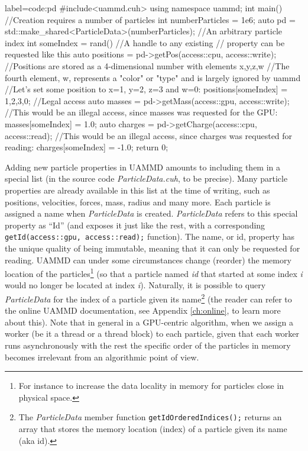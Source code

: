 \documentclass[ twoside,openright,titlepage,numbers=noenddot,%
headinclude,footinclude,cleardoublepage=empty,abstract=on,
BCOR=5mm,paper=b5,fontsize=11pt, dvipsnames
]{scrreprt}
\def\ucpp{uammd_cpp_lexer.py:UAMMDCppLexer -x}
\newcommand{\uammd}{\gls{UAMMD}\xspace}
\begin{document}
\begin{code2}
  {label=code:pd}
#include<uammd.cuh>
using namespace uammd; 
int main(){
  //Creation requires a number of particles
  int numberParticles = 1e6;
  auto pd = std::make_shared<ParticleData>(numberParticles);
  //An arbitrary particle index
  int someIndex = rand()%
  //A handle to any existing 
  // property can be requested like this
  auto positions = pd->getPos(access::cpu, access::write);
  //Positions are stored as a 4-dimensional number with elements x,y,z,w
  //The fourth element, w, represents a "color" or "type" and is largely ignored by uammd
  //Let's set some position to x=1, y=2, z=3 and w=0:
  positions[someIndex] = {1,2,3,0}; //Legal access
  auto masses = pd->getMass(access::gpu, access::write);
  //This would be an illegal access, since masses was requested for the GPU:
  masses[someIndex] = 1.0;
  auto charges = pd->getCharge(access::cpu, access::read);
  //This would be an illegal access, since charges was requested for reading:
  charges[someIndex] = -1.0;
  return 0;
}
\end{code2}
Adding new particle properties in \uammd amounts to including them in a special list (in the source code \emph{ParticleData.cuh}, to be precise). Many particle properties are already available in this list at the time of writing, such as positions, velocities, forces, mass, radius and many more. Each particle is assigned a name when \emph{ParticleData} is created. \emph{ParticleData} refers to this special property as ``Id'' (and exposes it just like the rest, with a corresponding \texttt{getId(access::gpu, access::read);} function). The name, or id, property has the unique quality of being immutable, meaning that it can only be requested for reading. \uammd can under some circumstances change (reorder) the memory location of the particles\footnote{For instance to increase the data locality in memory for particles close in physical space.} (so that a particle named \emph{id} that started at some index \emph{i} would no longer be located at index \emph{i}). Naturally, it is possible to query \emph{ParticleData} for the index of a particle given its name\footnote{The \emph{ParticleData} member function \texttt{getIdOrderedIndices();} returns an array that stores the memory location (index) of a particle given its name (aka id).} (the reader can refer to the online \uammd documentation, see Appendix \ref{ch:online}, to learn more about this). Note that in general in a GPU-centric algorithm, when we assign a worker (be it a thread or a thread block) to each particle, given that each worker runs asynchronously with the rest the specific order of the particles in memory becomes irrelevant from an algorithmic point of view.
\end{document}
